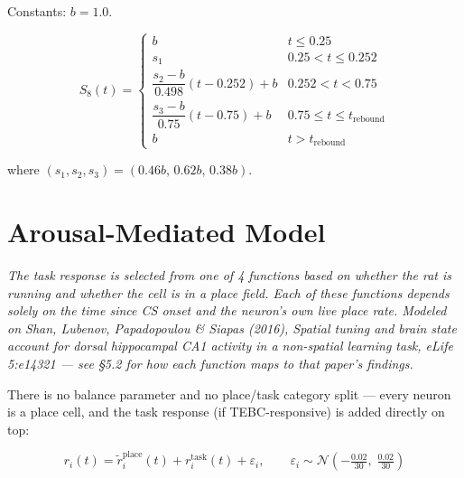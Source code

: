 \documentclass{article}
\begin{document}
Constants: $b = 1.0$.

\begin{equation}\label{eq:type8}
    S_8(t) = \begin{cases}
        b                                                                        & t \leq 0.25              \\[4pt]
        s_1                                                                      & 0.25 < t \leq 0.252      \\[6pt]
        \dfrac{s_2 - b}{0.498}(t - 0.252) + b                                  & 0.252 < t < 0.75         \\[8pt]
        \dfrac{s_3 - b}{0.75}(t - 0.75) + b                                    & 0.75 \leq t \leq t_{\mathrm{rebound}}     \\[6pt]
        b                                                                        & t > t_{\mathrm{rebound}}
    \end{cases}
\end{equation}

\noindent
where $(s_1, s_2, s_3) = (0.46b,\, 0.62b,\, 0.38b)$.

\section{Arousal-Mediated Model}

\textit{The task response is selected from one of 4 functions based on whether
the rat is running and whether the cell is in a place field. Each of these functions
depends solely on the time since CS onset and the neuron's own live place rate.
Modeled on Shan, Lubenov, Papadopoulou \& Siapas (2016), \emph{Spatial tuning and
brain state account for dorsal hippocampal CA1 activity in a non-spatial learning
task}, eLife 5:e14321 --- see \S5.2 for how each function maps to that paper's
findings.}

\bigskip\noindent
There is no balance parameter and no place/task category split --- every neuron is a
place cell, and the task response (if TEBC-responsive) is added directly on top:

\begin{equation}
    r_i(t) = \tilde{r}^{\mathrm{place}}_i(t) + r^{\mathrm{task}}_i(t) + \varepsilon_i,
    \qquad \varepsilon_i \sim \mathcal{N}\!\left(-\tfrac{0.02}{30},\; \tfrac{0.02}{30}\right)
\end{equation}
\end{document}
